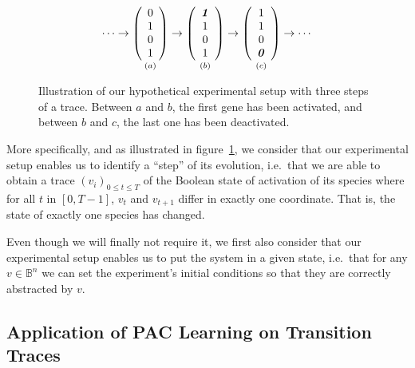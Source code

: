 \documentclass{llncs}
\begin{document}
\begin{figure}[htbp]
	{\large 
	\[
	\cdots
	\rightarrow
	\underset{\vspace{1em}(a)}{
		\left(\begin{array}{c}
		0\\ 1\\ 0\\ 1
		\end{array}\right)}
	\rightarrow
	\underset{\vspace{1em}(b)}{
		\left(\begin{array}{c}
		\textbf{\textit{1}}\\ 1\\ 0\\ 1
		\end{array}\right)}
	\rightarrow
	\underset{\vspace{1em}(c)}{
		\left(\begin{array}{c}
		1\\ 1\\ 0\\ \textbf{\textit 0}
		\end{array}\right)}
	\rightarrow
	\cdots
	\]
}
	\caption{\label{steps}Illustration of our hypothetical experimental setup with three steps of a trace. Between $a$ and $b$, the first gene has been activated, and between $b$ and $c$, the last one has been deactivated.}
\end{figure}

More specifically, and as illustrated in figure~\ref{steps}, we consider that our experimental setup enables us to identify a ``step'' of its evolution, i.e.~that we are able to obtain a trace $(v_i)_{0 \leq t \leq T}$ of the Boolean state of activation of its species where for all $t$ in $[0,T-1]$, $v_t$ and $v_{t+1}$ differ in exactly one coordinate. That is, the state of exactly one species has changed.


Even though we will finally not require it, we first also consider that our experimental setup enables us to put the system in a given state, i.e.~that for any $v \in \mathbb{B}^n$ we can set the experiment's initial conditions so that they are correctly abstracted by $v$.

\subsection{Application of PAC Learning on Transition Traces}
\end{document}
